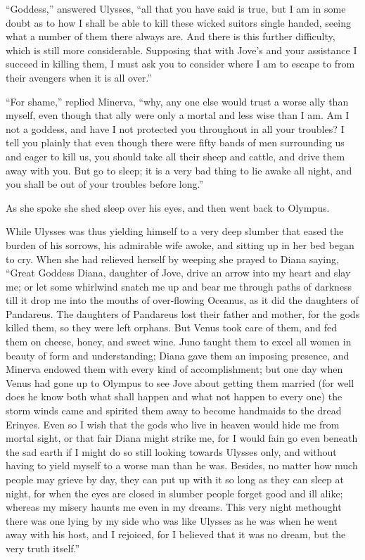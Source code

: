 “Goddess,” answered Ulysses, “all that you have said is true, but I am in some
doubt as to how I shall be able to kill these wicked suitors single handed,
seeing what a number of them there always are. And there is this further
difficulty, which is still more considerable. Supposing that with Jove’s and
your assistance I succeed in killing them, I must ask you to consider where I
am to escape to from their avengers when it is all over.”

“For shame,” replied Minerva, “why, any one else would trust a worse ally than
myself, even though that ally were only a mortal and less wise than I am. Am I
not a goddess, and have I not protected you throughout in all your troubles? I
tell you plainly that even though there were fifty bands of men surrounding us
and eager to kill us, you should take all their sheep and cattle, and drive
them away with you. But go to sleep; it is a very bad thing to lie awake all
night, and you shall be out of your troubles before long.”

As she spoke she shed sleep over his eyes, and then went back to Olympus.

While Ulysses was thus yielding himself to a very deep slumber that eased the
burden of his sorrows, his admirable wife awoke, and sitting up in her bed
began to cry. When she had relieved herself by weeping she prayed to Diana
saying, “Great Goddess Diana, daughter of Jove, drive an arrow into my heart
and slay me; or let some whirlwind snatch me up and bear me through paths of
darkness till it drop me into the mouths of over-flowing Oceanus, as it did the
daughters of Pandareus. The daughters of Pandareus lost their father and
mother, for the gods killed them, so they were left orphans. But Venus took
care of them, and fed them on cheese, honey, and sweet wine. Juno taught them
to excel all women in beauty of form and understanding; Diana gave them an
imposing presence, and Minerva endowed them with every kind of accomplishment;
but one day when Venus had gone up to Olympus to see Jove about getting them
married (for well does he know both what shall happen and what not happen to
every one) the storm winds came and spirited them away to become handmaids to
the dread Erinyes. Even so I wish that the gods who live in heaven would hide
me from mortal sight, or that fair Diana might strike me, for I would fain go
even beneath the sad earth if I might do so still looking towards Ulysses only,
and without having to yield myself to a worse man than he was. Besides, no
matter how much people may grieve by day, they can put up with it so long as
they can sleep at night, for when the eyes are closed in slumber people forget
good and ill alike; whereas my misery haunts me even in my dreams. This very
night methought there was one lying by my side who was like Ulysses as he was
when he went away with his host, and I rejoiced, for I believed that it was no
dream, but the very truth itself.”

